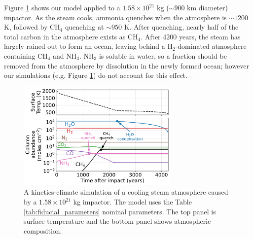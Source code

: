 Figure \ref{fig:figure1} shows our model applied to a $1.58 \times 10^{21}$ kg ($\sim 900$ km diameter) impactor. As the steam cools, ammonia quenches when the atmosphere is $\sim 1200$ K, followed by CH$_4$ quenching at $\sim 950$ K. After quenching, nearly half of the total carbon in the atmosphere exists as CH$_4$. After 4200 years, the steam has largely rained out to form an ocean, leaving behind a H$_2$-dominated atmosphere containing CH$_4$ and NH$_3$. NH$_3$ is soluble in water, so a fraction should be removed from the atmosphere by dissolution in the newly formed ocean; however our simulations (e.g. Figure \ref{fig:figure1}) do not account for this effect. 

\begin{figure}
  \centering
  \includegraphics[width=0.7\textwidth]{tex/5impacts/figures/Figure1.pdf}
  \caption{A kinetics-climate simulation of a cooling steam atmosphere caused by a $1.58 \times 10^{21}$ kg impactor. The model uses the Table \ref{tab:fiducial_parameters} nominal parameters. The top panel is surface temperature and the bottom panel shows atmospheric composition.}
  \label{fig:figure1}
\end{figure}

